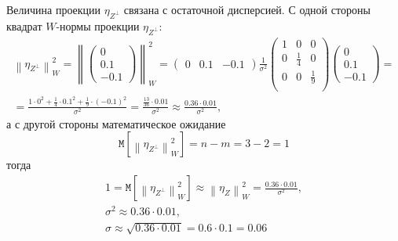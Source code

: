 \documentclass[a4paper,12pt]{article}
\newcommand{\expectation}[1]{\texttt{M} \left[ #1 \right]}
\newcommand{\norm}[1]{\left \| #1 \right \|}
\newcommand{\pr}[2]{#1_{#2}}
\newcommand{\pro}[2]{#1_{#2^\perp}}
\begin{document}
\begin{enumerate}
          Величина проекции $\pro{\eta}{Z}$ связана с остаточной дисперсией. С одной стороны квадрат $W$-нормы проекции
          $\pro{\eta}{Z}$:
          \begin{multline*}
              \norm{\pro{\eta}{Z}}_W^2
              = \norm{
                  \begin{pmatrix}
                      0   \\
                      0.1 \\
                      -0.1
                  \end{pmatrix}
              }_W^2
              =
              \begin{pmatrix}
                  0 & 0.1 & -0.1
              \end{pmatrix}
              \frac{1}{\sigma^2}
              \begin{pmatrix}
                  1 & 0           & 0           \\
                  0 & \frac{1}{4} & 0           \\
                  0 & 0           & \frac{1}{9} \\
              \end{pmatrix}
              \begin{pmatrix}
                  0   \\
                  0.1 \\
                  -0.1
              \end{pmatrix} = \\
              = \frac{1 \cdot 0^2 + \frac{1}{4} \cdot 0.1^2 + \frac{1}{9} \cdot (-0.1)^2}{\sigma^2}
              = \frac{\frac{13}{36} \cdot 0.01}{\sigma^2}
              \approx \frac{0.36 \cdot 0.01}{\sigma^2},
          \end{multline*}
          а с другой стороны математическое ожидание
          \[
              \expectation{\norm{\pro{\eta}{Z}}_W^2} = n - m = 3 - 2 = 1
          \]
          тогда
          \begin{gather*}
              1 = \expectation{\norm{\pro{\eta}{Z}}_W^2} \approx \norm{\pr{\eta}{Z}}_W^2 = \frac{0.36 \cdot 0.01}{\sigma^2} , \\
              \sigma^2 \approx 0.36 \cdot 0.01 , \\
              \sigma \approx \sqrt{0.36 \cdot 0.01} = 0.6 \cdot 0.1 = 0.06
          \end{gather*}


\end{enumerate}
\end{document}
